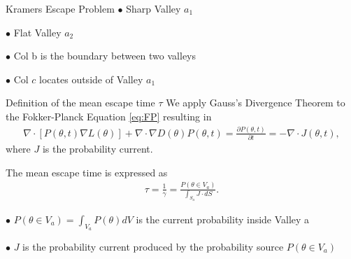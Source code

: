 \documentclass{beamer}
\begin{document}
\begin{frame}{Kramers Escape Problem}     
     $\bullet$ Sharp Valley $a_{1}$ 
     
     $\bullet$ Flat Valley $a_{2}$ 
     
     $\bullet$ Col b is the boundary between two valleys

     $\bullet$ Col $c$ locates outside of Valley $a_{1}$
     
\setcounter{subfigure}{0}
     \begin{figure}
\center
{} %
\end{figure}
\end{frame}

\begin{frame}{Definition of the mean escape time $\tau$}
    We apply Gauss's Divergence Theorem to the Fokker-Planck Equation \eqref{eq:FP} resulting in
\begin{align*}
 \nabla \cdot [P(\theta, t) \nabla L(\theta) ]  + \nabla \cdot \nabla D(\theta)  P(\theta, t) = \frac{\partial P(\theta, t)}{\partial t} =  - \nabla \cdot J(\theta, t),
\end{align*}
where $J$ is the probability current. 

\vspace{3mm}

The mean escape time is expressed as
\begin{align*}
\tau = \frac{1}{\gamma} = \frac{P(\theta \in V_{a} ) }{\int_{S_{a}} J \cdot dS}.
\end{align*}

$\bullet$ $P(\theta \in V_{a} ) = \int_{V_{a}} P(\theta) dV$ is the current probability inside Valley a

$\bullet$ $J$ is the probability current produced by the probability source $P(\theta \in V_{a} )$
\end{frame}
\end{document}
